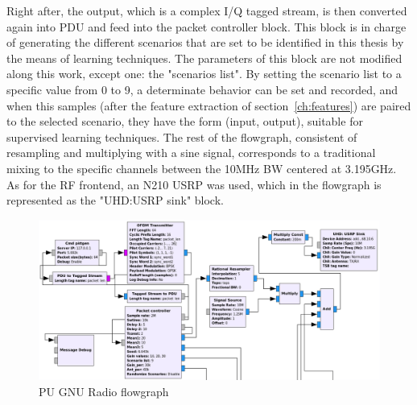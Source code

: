 Right after, the output, which is a complex I/Q tagged stream, is then converted again into \ac{PDU} and feed into the packet controller block. This block is in charge of generating the different scenarios that are set to be identified in this thesis by the means of learning techniques. The parameters of this block are not modified along this work, except one: the "scenarios list". By setting the scenario list to a specific value from 0 to 9, a determinate behavior can be set and recorded, and when this samples (after the feature extraction of section~\ref{ch:features}) are paired to the selected scenario, they have the form (input, output), suitable for supervised learning techniques. The rest of the flowgraph, consistent of resampling and multiplying with a sine signal, corresponds to a traditional mixing to the specific channels between the 10MHz \ac{BW} centered at 3.195GHz. As for the \ac{RF} frontend, an N210 \ac{USRP} was used, which in the flowgraph is represented as the "UHD:USRP sink" block.

\begin{figure}[!htb]
    \centering
    \includegraphics[width=\textwidth]{figures/PU_flowgraph}
    \caption{\ac{PU} GNU Radio flowgraph}
    \label{fig:PU_flowgraph}
\end{figure}

